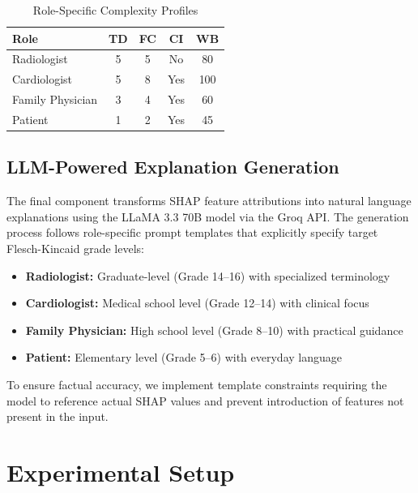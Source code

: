 \documentclass{ieeeaccess}
\begin{document}
\begin{table}[t]
\caption{Role-Specific Complexity Profiles}
\label{tab:role_profiles}
\centering
\begin{tabular}{lcccc}
\toprule
\textbf{Role} & \textbf{TD} & \textbf{FC} & \textbf{CI} & \textbf{WB} \\
\midrule
Radiologist & 5 & 5 & No & 80 \\
Cardiologist & 5 & 8 & Yes & 100 \\
Family Physician & 3 & 4 & Yes & 60 \\
Patient & 1 & 2 & Yes & 45 \\
\bottomrule
\end{tabular}
\end{table}

\subsection{LLM-Powered Explanation Generation}

The final component transforms SHAP feature attributions into natural language explanations using the LLaMA 3.3 70B model via the Groq API. The generation process follows role-specific prompt templates that explicitly specify target Flesch-Kincaid grade levels:

\begin{itemize}
\item \textbf{Radiologist:} Graduate-level (Grade 14--16) with specialized terminology
\item \textbf{Cardiologist:} Medical school level (Grade 12--14) with clinical focus
\item \textbf{Family Physician:} High school level (Grade 8--10) with practical guidance
\item \textbf{Patient:} Elementary level (Grade 5--6) with everyday language
\end{itemize}

To ensure factual accuracy, we implement template constraints requiring the model to reference actual SHAP values and prevent introduction of features not present in the input.


\section{Experimental Setup}
\label{sec:experiments}
\end{document}
